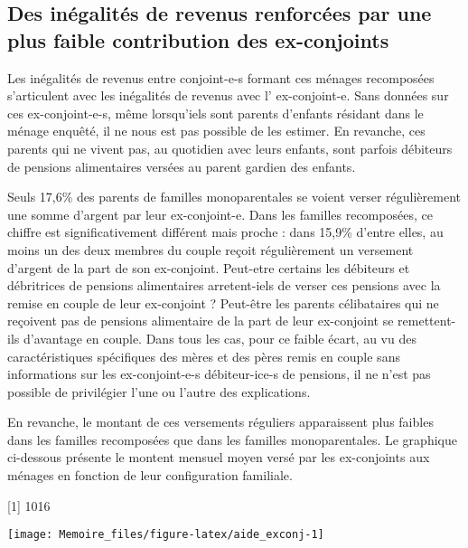 \documentclass[
  12pt,
]{book}
\begin{document}
\subsection{Des inégalités de revenus renforcées par une plus faible
contribution des
ex-conjoints}\label{des-inuxe9galituxe9s-de-revenus-renforcuxe9es-par-une-plus-faible-contribution-des-ex-conjoints}

Les inégalités de revenus entre conjoint-e-s formant ces ménages
recomposées s'articulent avec les inégalités de revenus avec l'
ex-conjoint-e. Sans données sur ces ex-conjoint-e-s, même lorsqu'iels
sont parents d'enfants résidant dans le ménage enquêté, il ne nous est
pas possible de les estimer. En revanche, ces parents qui ne vivent pas,
au quotidien avec leurs enfants, sont parfois débiteurs de pensions
alimentaires versées au parent gardien des enfants.

Seuls 17,6\% des parents de familles monoparentales se voient verser
régulièrement une somme d'argent par leur ex-conjoint-e. Dans les
familles recomposées, ce chiffre est significativement différent mais
proche : dans 15,9\% d'entre elles, au moins un des deux membres du
couple reçoit régulièrement un versement d'argent de la part de son
ex-conjoint. Peut-etre certains les débiteurs et débritrices de pensions
alimentaires arretent-iels de verser ces pensions avec la remise en
couple de leur ex-conjoint ? Peut-être les parents célibataires qui ne
reçoivent pas de pensions alimentaire de la part de leur ex-conjoint se
remettent-ils d'avantage en couple. Dans tous les cas, pour ce faible
écart, au vu des caractéristiques spécifiques des mères et des pères
remis en couple sans informations sur les ex-conjoint-e-s débiteur-ice-s
de pensions, il ne n'est pas possible de privilégier l'une ou l'autre
des explications.

En revanche, le montant de ces versements réguliers apparaissent plus
faibles dans les familles recomposées que dans les familles
monoparentales. Le graphique ci-dessous présente le montent mensuel
moyen versé par les ex-conjoints aux ménages en fonction de leur
configuration familiale.

{[}1{]} 1016

\begin{center}\texttt{[image: Memoire\_files/figure-latex/aide\_exconj-1]} \end{center}
\end{document}
